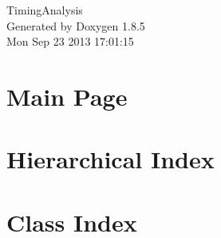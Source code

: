\documentclass[twoside]{book}
\newcommand{\clearemptydoublepage}{%
  \newpage{\pagestyle{empty}\cleardoublepage}%
}
\begin{document}
\hypersetup{pageanchor=false}
\begin{titlepage}
\vspace*{7cm}
\begin{center}%
{\Large Timing\-Analysis }\\
\vspace*{1cm}
{\large Generated by Doxygen 1.8.5}\\
\vspace*{0.5cm}
{\small Mon Sep 23 2013 17:01:15}\\
\end{center}
\end{titlepage}
\clearemptydoublepage
\tableofcontents
\clearemptydoublepage
{}
\hypersetup{pageanchor=true}

\chapter{Main Page}
\label{index}\hypertarget{index}{}
\chapter{Hierarchical Index}

\chapter{Class Index}

\end{document}
